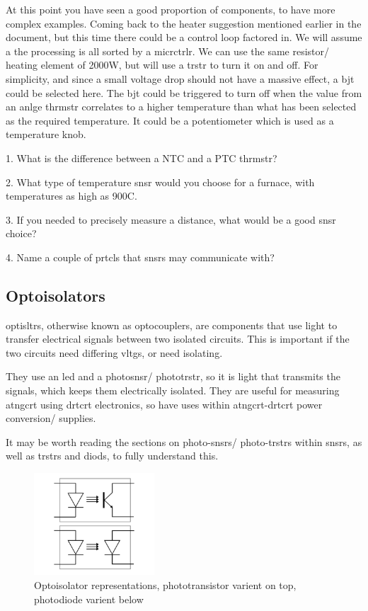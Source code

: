 \documentclass[a4paper,11pt]{report}
\newcommand{\Examples}[1] %
{
\par\noindent %
\phantomsection %
\todo[inline, color=red!30]{\textbf{#1}} %
\vspace{1em} %
}
\newcommand{\Quiz}[1] %
{
\par\noindent %
\phantomsection %
\todo[inline, color=blue!30]{\textbf{#1}} %
\vspace{1em} %
}
\begin{document}
\Examples{Examples}

At this point you have seen a good proportion of components, to have more complex examples. Coming back to the heater suggestion mentioned earlier in the document, but this time there could be a control loop factored in. We will assume a the processing is all sorted by a \gls{micrctrlr}. We can use the same resistor/ heating element of 2000W, but will use a \gls{trstr} to turn it on and off. For simplicity, and since a small voltage drop should not have a massive effect, a \gls{bjt} could be selected here. The \gls{bjt} could be triggered to turn off when the value from an \gls{anlge} \gls{thrmstr} correlates to a higher temperature than what has been selected as the required temperature. It could be a potentiometer which is used as a temperature knob.

\Quiz{Quiz}

1. What is the difference between a NTC and a PTC \gls{thrmstr}?

2. What type of temperature \gls{snsr} would you choose for a furnace, with temperatures as high as 900\degree C.

3. If you needed to precisely measure a distance, what would be a good \gls{snsr} choice?

4. Name a couple of \gls{prtcl}s that \gls{snsr}s may communicate with?

\vspace*{1\baselineskip}

\subsection{Optoisolators}

\gls{optisltr}s, otherwise known as optocouplers, are components that use light to transfer electrical signals between two isolated circuits. This is important if the two circuits need differing \gls{vltg}s, or need isolating.

They use an \gls{led} and a photo\gls{snsr}/ photo\gls{trstr}, so it is light that transmits the signals, which keeps them electrically isolated. They are useful for measuring \gls{atngcrt} using \gls{drtcrt} electronics, so have uses within \gls{atngcrt}-\gls{drtcrt} power conversion/ supplies.

It may be worth reading the sections on photo-\gls{snsr}s/ photo-\gls{trstr}s within \gls{snsr}s, as well as \gls{trstr}s and \gls{diod}s, to fully understand this.

\begin{figure}[H]
\centering
\includegraphics[width=0.4\textwidth]{optoisolator1}
\caption{Optoisolator representations, phototransistor varient on top, photodiode varient below}
\end{figure}
\end{document}
